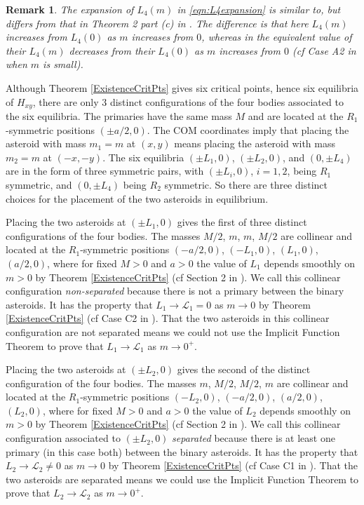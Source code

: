 \documentclass[12pt]{article}
\newtheorem{remark}{Remark}%
\begin{document}
\begin{remark}
The expansion of $L_4(m)$ in \eqref{eqn:L4expansion} is similar to, but differs from that in Theorem 2 part (c) in \cite{Corbera2014}. The difference is that here $L_4(m)$ increases from $L_4(0)$ as $m$ increases from $0$, whereas in \cite{Corbera2014} the equivalent value of their $L_4(m)$ decreases from their $L_4(0)$ as $m$ increases from $0$ (cf Case A2 in \cite{Roy} when $m$ is small).
\end{remark}

Although Theorem \ref{ExistenceCritPts} gives six critical points, hence six equilibria of $H_{xy}$, there are only $3$ distinct configurations of the four bodies associated to the six equilibria. The primaries have the same mass $M$ and are located at the $R_1$-symmetric positions $(\pm a/2,0)$. The COM coordinates imply that placing the asteroid with mass $m_1=m$ at $(x,y)$ means placing the asteroid with mass $m_2=m$ at $(-x,-y)$. The six equilibria  $(\pm L_1,0)$, $(\pm L_2,0)$, and $(0,\pm L_4)$ are in the form of three symmetric pairs, with $(\pm L_i,0)$, $i=1,2$, being $R_1$ symmetric, and $(0,\pm L_4)$ being $R_2$ symmetric. So there are three distinct choices for the placement of the two asteroids in equilibrium.

Placing the two asteroids at $(\pm L_1,0)$ gives the first of three distinct configurations of the four bodies. The masses $M/2$, $m$, $m$, $M/2$ are collinear and located at the $R_1$-symmetric positions $(-a/2,0)$, $(-L_1,0)$, $(L_1,0)$, $(a/2,0)$, where for fixed $M>0$ and $a>0$ the value of $L_1$ depends smoothly on $m>0$ by Theorem \ref{ExistenceCritPts} (cf Section 2 in \cite{Shoaib}). We call this collinear configuration {\it non-separated} because there is not a primary between the binary asteroids. It has the property that $L_1\to {\mathcal L}_1 = 0$ as $m\to 0$ by Theorem \ref{ExistenceCritPts} (cf Case C2 in \cite{Roy}). That the two asteroids in this collinear configuration are not separated means we could not use the Implicit Function Theorem to prove that $L_1\to {\mathcal L}_1$ as $m\to 0^+$.

Placing the two asteroids at $(\pm L_2,0)$ gives the second of the distinct configuration of the four bodies. The masses $m$, $M/2$, $M/2$, $m$ are collinear and located at the $R_1$-symmetric positions $(-L_2,0)$, $(-a/2,0)$, $(a/2,0)$, $(L_2,0)$, where for fixed $M>0$ and $a>0$ the value of $L_2$ depends smoothly on $m>0$ by Theorem \ref{ExistenceCritPts} (cf Section 2 in \cite{Shoaib}). We call this collinear configuration associated to $(\pm L_2,0)$ {\it separated} because there is at least one primary (in this case both) between the binary asteroids. It has the property that $L_2\to {\mathcal L}_2 \ne 0$ as $m\to 0$ by Theorem \ref{ExistenceCritPts} (cf Case C1 in \cite{Roy}). That the two asteroids are separated means we could use the Implicit Function Theorem to prove that $L_2\to {\mathcal L}_2$ as $m\to 0^+$.
\end{document}
